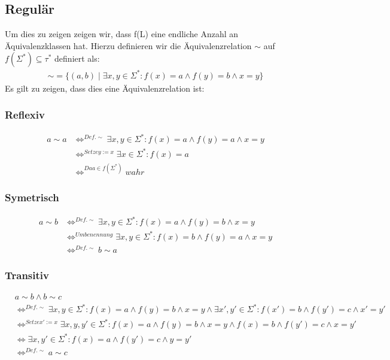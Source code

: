 \documentclass[12pt, a4paper]{article}
\begin{document}
\subsection*{Regulär}
Um dies zu zeigen zeigen wir, dass f(L) eine endliche Anzahl an Äquivalenzklassen hat. Hierzu definieren wir die Äquivalenzrelation $\sim$ auf $f(\Sigma^*)\subseteq \tau^*$ definiert als:
\begin{align*}
\sim = \{(a,b) \mid \exists x,y \in \Sigma^*: f(x) = a \wedge f(y) = b \wedge x = y \}
\end{align*}
Es gilt zu zeigen, dass dies eine Äquivalenzrelation ist:

\subsubsection*{Reflexiv}
\begin{align*}
a \sim a &\Longleftrightarrow^{Def. \sim} \exists x,y \in \Sigma^*: f(x) = a \wedge f(y) = a \wedge x = y \\
&\Longleftrightarrow^{Setze y := x} \exists x \in \Sigma^*: f(x) = a \\
&\Longleftrightarrow^{Da a \in f(\Sigma^*)} wahr
\end{align*}

\subsubsection*{Symetrisch}
\begin{align*}
a \sim b &\Longleftrightarrow^{Def. \sim} \exists x,y \in \Sigma^*:  f(x) = a \wedge f(y) = b \wedge x = y \\
&\Longleftrightarrow^{Umbenennung} \exists x,y \in \Sigma^*:  f(x) = b \wedge f(y) = a \wedge x = y \\
&\Longleftrightarrow^{Def. \sim} b \sim a
\end{align*}

\subsubsection*{Transitiv}
\begin{align*}
&a \sim b \wedge b \sim c \\
&\Longleftrightarrow^{Def. \sim} \exists x,y \in \Sigma^*:  f(x) = a \wedge f(y) = b \wedge x = y \wedge \exists x',y' \in \Sigma^*:  f(x') = b \wedge f(y') = c \wedge x' = y' \\ 
&\Longleftrightarrow^{Setze x' := x} \exists x,y,y' \in \Sigma^*:  f(x) = a \wedge f(y) = b \wedge x = y \wedge  f(x) = b \wedge f(y') = c \wedge x = y' \\ 
&\Longleftrightarrow \exists x,y' \in \Sigma^*:  f(x) = a  \wedge f(y') = c \wedge y = y' \\
&\Longleftrightarrow^{Def. \sim} a \sim c
\end{align*}
\end{document}

